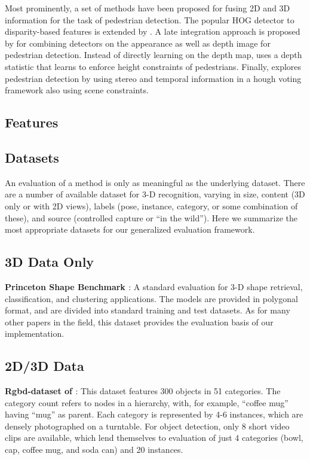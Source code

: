 Most prominently, a set of methods have been proposed for fusing 2D and 3D information for the task of pedestrian detection.
The popular HOG detector \cite{Dalal2005} to disparity-based features is extended by \cite{hattori}.
A late integration approach is proposed by \cite{rohrbach09dagm} for combining detectors on the appearance as well as depth image for pedestrian detection.
Instead of directly learning on the depth map, \cite{walk10eccv} uses a depth statistic that learns to enforce height constraints of pedestrians.
Finally, \cite{leibe10ijrr} explores pedestrian detection by using stereo and temporal information in a hough voting framework also using scene constraints.

\subsection{Features}

\subsection{Datasets}

An evaluation of a method is only as meaningful as the underlying dataset.
There are a number of available dataset for 3-D recognition, varying in size, content (3D only or with 2D views), labels (pose, instance, category, or some combination of these), and source (controlled capture or ``in the wild'').
Here we summarize the most appropriate datasets for our generalized evaluation framework.

\subsection{3D Data Only}
{\bf Princeton Shape Benchmark \cite{Shilane2004}}:
A standard evaluation for 3-D shape retrieval, classification, and clustering applications.
The models are provided in polygonal format, and are divided into standard training and test datasets.
As for many other papers in the field, this dataset provides the evaluation basis of our implementation.

\subsection{2D/3D Data}
{\bf Rgbd-dataset of \cite{Lai2011}}:
This dataset features 300 objects in 51 categories.
The category count refers to nodes in a hierarchy, with, for example, ``coffee mug'' having ``mug'' as parent.
Each category is represented by 4-6 instances, which are densely photographed on a turntable.
For object detection, only 8 short video clips are available, which lend themselves to evaluation of just 4 categories (bowl, cap, coffee mug, and soda can) and 20 instances.

